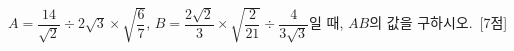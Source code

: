 $A=\dfrac{14}{\sqrt{2}}\div2\sqrt{3}\times\sqrt{\dfrac{6}{7}}$, $B=\dfrac{2\sqrt{2}}{3}\times\sqrt{\dfrac{2}{21}}\div\dfrac{4}{3\sqrt{3}}$일 때, $AB$의 값을 구하시오.~\mbox{\mbox{[7점]}}
